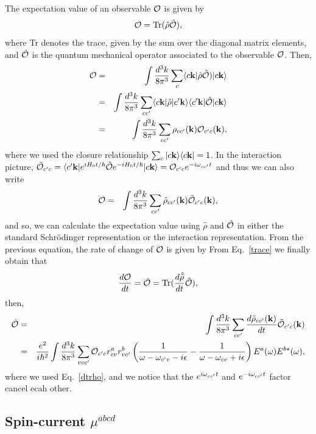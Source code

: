 \documentclass[floatfix,prb,aps,superscriptaddress,11pt]{revtex4}
\begin{document}
The expectation value of an observable ${\cal O}$ is given by
\begin{equation}\label{trace}
{\cal O}=\mbox{Tr}(\hat\rho\hat{\cal O})
,
\end{equation} 
where  Tr denotes the trace, given by the sum over the diagonal matrix
elements,
 and $\hat{\cal O}$ is the quantum
mechanical operator associated to the observable ${\cal O}$.
 Then,
\begin{eqnarray}\label{trace1}
{\cal O}
&=&
\int\frac{d^3k}{8\pi^3}
\sum_c
\langle c\mathbf{k} |
\hat\rho\hat{\cal O})
| c\mathbf{k} \rangle
\nonumber \\
&=&
\int\frac{d^3k}{8\pi^3}
\sum_{cc'}
\langle c\mathbf{k} |
\hat\rho
| c'\mathbf{k} \rangle
\langle c'\mathbf{k} |
\hat{\cal O}
| c\mathbf{k} \rangle
\nonumber \\
&=&
\int\frac{d^3k}{8\pi^3}
\sum_{cc'}
\rho_{cc'}(\mathbf{k})
{\cal O}_{c'c}(\mathbf{k})
,
\end{eqnarray} 
where we used the closure relationship
$\sum_c| c\mathbf{k} \rangle\langle c\mathbf{k} |=1$. In the interaction picture,
$\tilde{\cal O}_{c'c}=\langle c'\mathbf{k} |
e^{iH_0t/\hbar}\hat{\cal O} e^{-iH_0t/\hbar}| c\mathbf{k} \rangle
={\cal O}_{c'c}e^{-i\omega_{cc'}t}$
and thus we can also write
\begin{eqnarray}\label{trace2}
{\cal O}
&=&
\int\frac{d^3k}{8\pi^3}
\sum_{cc'}
\tilde\rho_{cc'}(\mathbf{k})
\tilde{\cal O}_{c'c}(\mathbf{k})
,
\end{eqnarray} 
and so, we can calculate the expectation value using $\hat\rho$
 and $\hat{\cal O}$ in either the standard  Schr\"odinger
 representation or the
interaction representation. From the previous equation,
the rate of change of ${\cal O}$ is given by
From Eq.~\eqref{trace} we finally obtain that 
\begin{align}\label{0.e}
\frac{d{\cal O}}{dt}
=\dot{{\cal O}}=
\mathrm{Tr}(\frac{d\hat{{\tilde\rho}}}{dt}\tilde{{\cal O}}) 
,
\end{align}
then,
\begin{eqnarray}\label{trace3}
\dot{{\cal O}}  
&=&
\int\frac{d^3k}{8\pi^3}
\sum_{cc'}
\frac{d\tilde\rho_{cc'}(\mathbf{k})}{dt}
\tilde{\cal O}_{c'c}(\mathbf{k})  
\nonumber\\
&=&
\frac{e^2}{i\hbar^2}
\int\frac{d^3k}{8\pi^3}
\sum_{vcc'}
{\cal O}_{c'c}r^a_{cv}r^b_{vc'}
\left(
\frac{1}{\omega-\omega_{c'v}-i\epsilon}
-
\frac{1}
{\omega-\omega_{cv}+i\epsilon}
\right)  
E^a(\omega)E^{b\star}(\omega)  
,
\end{eqnarray}   
where we used Eq.~\eqref{dtrho}, and we notice that the
$e^{i\omega_{cc'}t}$
and $e^{-i\omega_{cc'}t}$ factor cancel ecah other.


\subsection{Spin-current $\mu^{abcd}$}\label{sec:SC}
\end{document}
